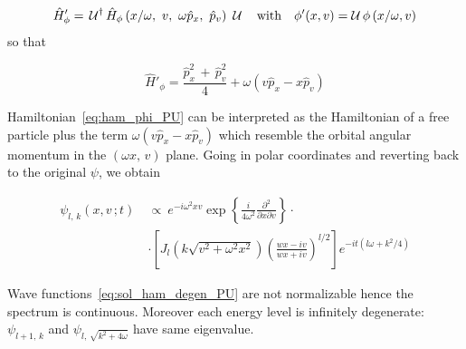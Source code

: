 \begin{equation*}
  \hat{H}'_{\phi} = \, \U^{\dagger}
  \hat{H}_{\phi} \left(x/\omega,\ v,\ \omega \hat{p}_x,\ \hat{p}_v\right) \ \U
  \quad \text{with} \quad
  \phi'(x, v) = \U \phi\left(x/\omega, v\right)
\end{equation*}
so that

\begin{equation} \label{eq:ham_phi_PU}
  \hat{H}'_{\phi} = \frac{\hat{p}^2_x \, + \, \hat{p}^2_{v}}{4}
  + \omega \left(v \hat{p}_x - x \hat{p}_v \right)
\end{equation}

Hamiltonian~\eqref{eq:ham_phi_PU} can be interpreted as the Hamiltonian of a
free particle plus the term $\omega \left(v \hat{p}_x - x \hat{p}_v \right)$
which resemble the orbital angular momentum in the $(\omega x, \, v)$ plane.
Going in polar coordinates and reverting back to the original $\psi$, we obtain

\begin{align} \label{eq:sol_ham_degen_PU}
  \psi_{l, \, k}(x, v \,; t) \ &\propto \
  e^{-i\omega^2xv}
  \exp\left\{
    \frac{i}{4\omega^2} \frac{\partial^2}{\partial x \partial v}
  \right\} \cdot \nonumber \\
  &\cdot \left[
    J_l \left(k\sqrt{v^2 + \omega^2 x^2}\right)
    {\left( \frac{wx - iv}{wx +iv} \right)}^{l/2}
  \right]
  e^{-it (l\omega + k^2/4)}
\end{align}

Wave functions~\eqref{eq:sol_ham_degen_PU} are not normalizable hence the
spectrum is continuous. Moreover each energy level is infinitely degenerate:
$\psi_{l+1, \, k}$ and $\psi_{l, \, \sqrt{k^2 + 4 \omega}}$ have same
eigenvalue.
